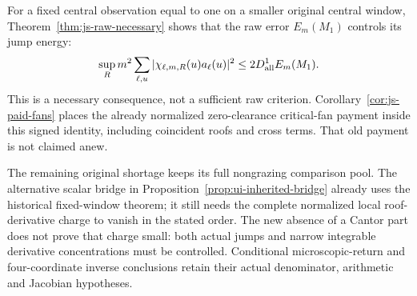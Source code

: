 For a fixed central observation equal to one on a smaller
original central window, Theorem~\ref{thm:js-raw-necessary}
shows that the raw error $E_m(M_1)$ controls its jump energy:
\[
 \sup_R m^2\sum_{\ell,u}
        |\chi_{\ell,m,R}(u)a_\ell(u)|^2
                 \le2D_{\rm all}^{1}E_m(M_1).
\]
This is a necessary consequence, not a sufficient raw
criterion. Corollary~\ref{cor:js-paid-fans} places the
already normalized zero-clearance critical-fan payment
inside this signed identity, including coincident roofs
and cross terms. That old payment is not claimed anew.

The remaining original shortage keeps its full nongrazing
comparison pool. The alternative scalar bridge in
Proposition~\ref{prop:ui-inherited-bridge} already uses
the historical fixed-window theorem; it still needs the
complete normalized local roof-derivative charge to
vanish in the stated order. The new absence of a Cantor
part does not prove that charge small: both actual jumps
and narrow integrable derivative concentrations must
be controlled. Conditional microscopic-return and
four-coordinate inverse conclusions retain their actual
denominator, arithmetic and Jacobian hypotheses.

